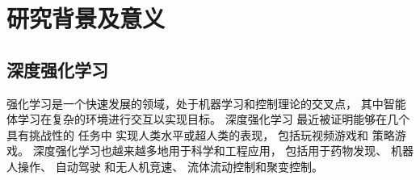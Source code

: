 \documentclass[AutoFakeBold]{LZUThesis}
\begin{document}
\section{研究背景及意义}
%
%
%
%




\subsection{深度强化学习}
强化学习是一个快速发展的领域，处于机器学习和控制理论的交叉点，
其中智能体学习在复杂的环境进行交互以实现目标\cite{Brunton_book_2019}。
深度强化学习 最近被证明能够在几个具有挑战性的
任务\cite{van_hasselt_deep_2016, sanghi_introduction_2021}中
实现人类水平或超人类的表现，
包括玩视频游戏\cite{mnih_human-level_2015, vinyals_grandmaster_2019}和
策略游戏\cite{silver_mastering_2016, silver_mastering_2017, silver_general_2018}。
深度强化学习也越来越多地用于科学和工程应用，
包括用于药物发现\cite{popova_deep_2018}、
机器人操作\cite{gu_deep_2017}、
自动驾驶\cite{sallab_deep_2017}
和无人机竞速\cite{kaufmann_champion-level_2023}、
流体流动控制\cite{gazzola_reinforcement_2014, colabrese_flow_2017, 
verma_efficient_2018, novati_controlled_2019, 
fan_reinforcement_2020}和聚变控制\cite{degrave_magnetic_2022}。
\end{document}
